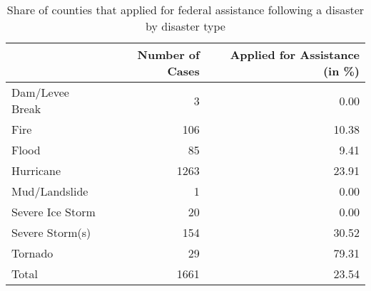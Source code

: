 \begin{table}

\caption{\label{tab:AppsByType}Share of counties that applied for federal assistance following a disaster by disaster type}
\centering
\begin{tabular}[!h]{lrr}
\toprule
  & Number of Cases & Applied for Assistance (in \%)\\
\midrule
Dam/Levee Break & 3 & 0.00\\
Fire & 106 & 10.38\\
Flood & 85 & 9.41\\
Hurricane & 1263 & 23.91\\
Mud/Landslide & 1 & 0.00\\
\addlinespace
Severe Ice Storm & 20 & 0.00\\
Severe Storm(s) & 154 & 30.52\\
Tornado & 29 & 79.31\\
Total & 1661 & 23.54\\
\bottomrule
\end{tabular}
\end{table}
